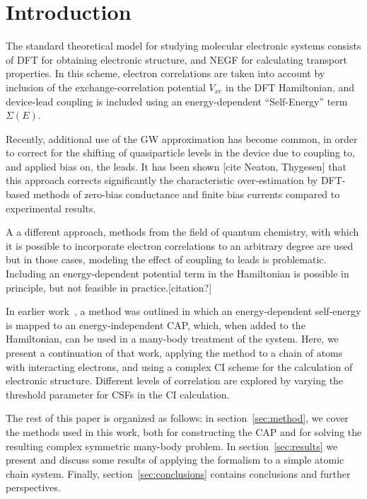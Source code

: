 \section{Introduction}

The standard theoretical model for studying molecular electronic systems
consists of \ac{DFT} for obtaining electronic structure, and \ac{NEGF} for
calculating transport properties. In this scheme, electron correlations are
taken into account by inclusion of the exchange-correlation potential $V_{xc}$
in the \ac{DFT} Hamiltonian, and device-lead coupling is included using an
energy-dependent ``Self-Energy'' term $\Sigma(E)$.

Recently, additional use of the GW approximation has become common, in order to
correct for the shifting of quasiparticle levels in the device due to coupling
to, and applied bias on, the leads. It has been shown [cite Neaton, Thygesen]
that this approach corrects significantly the characteristic over-estimation by
\ac{DFT}-based methods of zero-bias conductance and finite bias currents
compared to experimental results.

A a different approach, methods from the field of quantum chemistry, with which
it is possible to incorporate electron correlations to an arbitrary degree are
used \cite{delaney} but in those cases, modeling the effect of coupling to leads
is problematic. Including an energy-dependent potential term in the Hamiltonian
is possible in principle, but not feasible in practice.[citation?]

In earlier work~\cite{henderson}, a method was outlined in which an
energy-dependent self-energy is mapped to an energy-independent
\ac{CAP}, which, when added to the Hamiltonian, can be used
in a many-body treatment of the system. Here, we present a continuation of that
work, applying the method to a chain of atoms with interacting electrons, and
using a complex \ac{CI} scheme for the calculation of electronic structure.
Different levels of correlation are explored by varying the threshold
parameter for \acp{CSF} in the \ac{CI} calculation.

The rest of this paper is organized as follows: in section~\ref{sec:method}, we
cover the methods used in this work, both for constructing the \ac{CAP} and for
solving the resulting complex symmetric many-body problem. In
section~\ref{sec:results} we present and discuss some results of applying the
formalism to a simple atomic chain system. Finally,
section~\ref{sec:conclusions} contains conclusions and further perspectives.


